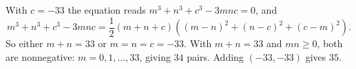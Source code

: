 With $c=-33$ the equation reads $m^3+n^3+c^3-3mnc=0$, and
\[m^3+n^3+c^3-3mnc=\dfrac12(m+n+c)\left((m-n)^2+(n-c)^2+(c-m)^2\right).\]
So either $m+n=33$ or $m=n=c=-33$. With $m+n=33$ and $mn\ge0$, both are nonnegative: $m=0,1,\dots,33$, giving $34$ pairs. Adding $(-33,-33)$ gives $\boxed{35}$.
